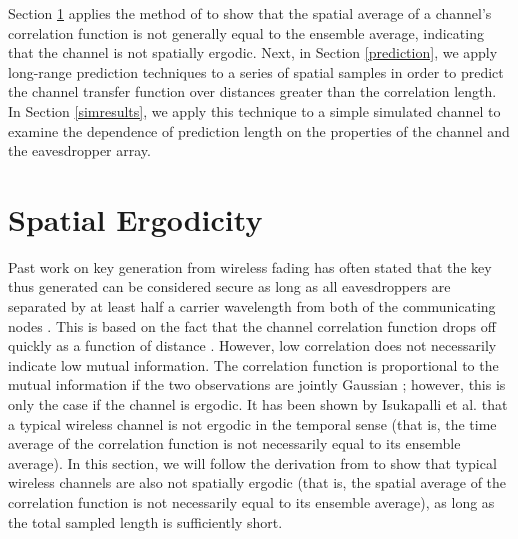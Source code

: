 \documentclass[11pt]{article} %
\begin{document}
Section \ref{ergodicity} applies the method of \cite{isukapalli2006} to show that the spatial average of a channel's correlation function is not generally equal to the ensemble average, indicating that the channel is not spatially ergodic. Next, in Section \ref{prediction}, we apply long-range prediction techniques to a series of spatial samples in order to predict the channel transfer function over distances greater than the correlation length.  In Section \ref{simresults}, we apply this technique to a simple simulated channel to examine the dependence of prediction length on the properties of the channel and the eavesdropper array. %


\section{Spatial Ergodicity}\label{ergodicity}
Past work on key generation from wireless fading has often stated that the key thus generated can be considered secure as long as all eavesdroppers are separated by at least half a carrier wavelength from both of the communicating nodes \cite{azimisadjadi2007, bloch2008, mathur2008, ye2010}.  This is based on the fact that the channel correlation function drops off quickly as a function of distance \cite{jakes1974}.  However, low correlation does not necessarily indicate low mutual information.  The correlation function is proportional to the mutual information if the two observations are jointly Gaussian \cite{li1990}; however, this is only the case if the channel is ergodic.  It has been shown by Isukapalli et al. \cite{isukapalli2006} that a typical wireless channel is not ergodic in the temporal sense (that is, the time average of the correlation function is not necessarily equal to its ensemble average).  In this section, we will follow the derivation from \cite{isukapalli2006} to show that typical wireless channels are also not spatially ergodic (that is, the spatial average of the correlation function is not necessarily equal to its ensemble average), as long as the total sampled length is sufficiently short.
\end{document}
